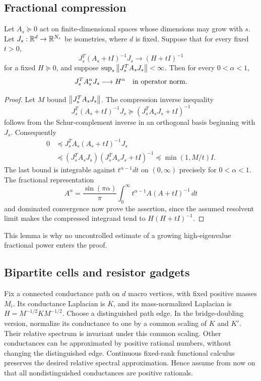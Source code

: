 \subsection{Fractional compression}
\begin{lemma}\label{u:lem:compression}
Let $A_s\succeq0$ act on finite-dimensional spaces whose dimensions
may grow with $s$. Let $J_s:\mathbb R^d\to\mathbb R^{N_s}$ be isometries, where
$d$ is fixed. Suppose that for every fixed $t>0$,
\[
 J_s^T(A_s+tI)^{-1}J_s\longrightarrow(H+tI)^{-1}
\]
for a fixed $H\succeq0$, and suppose
$\sup_s\left\lVert J_s^TA_sJ_s\right\rVert<\infty$. Then for every $0<\alpha<1$,
\[
 J_s^T A_s^\alpha J_s\longrightarrow H^\alpha
 \quad\hbox{in operator norm}.
\]
\end{lemma}
\begin{proof}
Let $M$ bound $\left\lVert J_s^TA_sJ_s\right\rVert$. The compression inverse inequality
\[
 J_s^T(A_s+tI)^{-1}J_s
       \succeq(J_s^TA_sJ_s+tI)^{-1}
\]
follows from the Schur-complement inverse in an orthogonal basis
beginning with $J_s$. Consequently
\begin{align*}
 0&\preceq J_s^T A_s(A_s+tI)^{-1}J_s\\
  &\preceq (J_s^TA_sJ_s)(J_s^TA_sJ_s+tI)^{-1}
   \preceq\min(1,M/t)I.
\end{align*}
The last bound is integrable against $t^{\alpha-1}dt$ on
$(0,\infty)$ precisely for $0<\alpha<1$.
The fractional representation
\[
 A^\alpha=\frac{\sin(\pi\alpha)}\pi
             \int_0^\infty t^{\alpha-1}A(A+tI)^{-1}\,dt
\]
and dominated convergence now prove the assertion, since the assumed
resolvent limit makes the compressed integrand tend to
$H(H+tI)^{-1}$.
\end{proof}

This lemma is why no uncontrolled estimate of a growing high-eigenvalue
fractional power enters the proof.

\subsection{Bipartite cells and resistor gadgets}
Fix a connected conductance path on $d$ macro vertices, with fixed
positive masses $M_i$. Its conductance Laplacian is $K$, and its
mass-normalized Laplacian is $H=M^{-1/2}KM^{-1/2}$.
Choose a distinguished path edge. In the bridge-doubling version,
normalize its conductance to one by a common scaling of $K$ and $K'$.
Their relative spectrum is invariant under this common scaling.
Other conductances can be approximated by positive rational numbers,
without changing the distinguished edge. Continuous fixed-rank
functional calculus preserves the desired relative spectral approximation.
Hence assume from now on that all nondistinguished conductances are
positive rationals.


